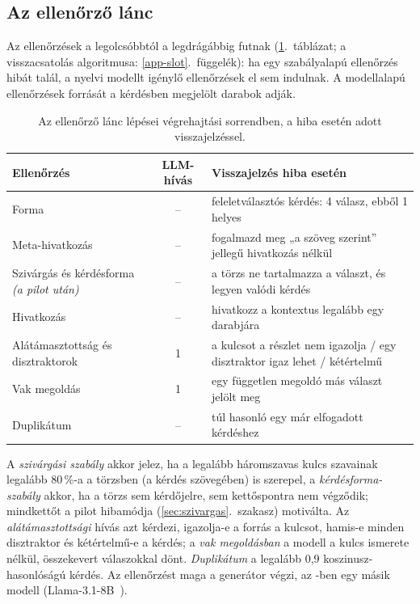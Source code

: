 \subsection{Az ellenőrző lánc}
\label{sec:verifier}

Az ellenőrzések a legolcsóbbtól a legdrágábbig futnak (\ref{tab:checks}.~táblázat; a visszacsatolás
algoritmusa: \ref{app-slot}.~függelék): ha egy szabályalapú ellenőrzés
hibát talál, a nyelvi modellt igénylő ellenőrzések el sem indulnak. A modellalapú ellenőrzések forrását a
kérdésben megjelölt darabok adják.

\begin{table}[htbp]
\centering
\caption{Az ellenőrző lánc lépései végrehajtási sorrendben, a hiba esetén adott visszajelzéssel.}
\label{tab:checks}
\small
\begin{tabularx}{\textwidth}{@{}>{\raggedright\arraybackslash}p{3.8cm}c>{\raggedright\arraybackslash}X@{}}
\toprule
Ellenőrzés & LLM-hívás & Visszajelzés hiba esetén \\
\midrule
Forma & -- & feleletválasztós kérdés: 4 válasz, ebből 1 helyes \\
Meta-hivatkozás & -- & fogalmazd meg „a szöveg szerint” jellegű hivatkozás nélkül \\
Szivárgás és kérdésforma \emph{(a pilot után)} & -- & a törzs ne tartalmazza a választ, és legyen valódi kérdés \\
Hivatkozás & -- & hivatkozz a kontextus legalább egy darabjára \\
Alátámasztottság és disztraktorok & 1 & a kulcsot a részlet nem igazolja / egy disztraktor igaz lehet / kétértelmű \\
Vak megoldás & 1 & egy független megoldó más választ jelölt meg \\
Duplikátum & -- & túl hasonló egy már elfogadott kérdéshez \\
\bottomrule
\end{tabularx}
\end{table}

A \emph{szivárgási szabály} akkor jelez, ha a legalább háromszavas kulcs szavainak legalább 80\,\%-a a
törzsben (a kérdés szövegében) is szerepel, a \emph{kérdésforma-szabály} akkor, ha a törzs sem kérdőjelre,
sem kettőspontra nem végződik; mindkettőt a pilot hibamódja (\ref{sec:szivargas}.~szakasz) motiválta.
Az \emph{alátámasztottsági} hívás azt kérdezi, igazolja-e a forrás a kulcsot, hamis-e minden disztraktor
és kétértelmű-e a kérdés; a \emph{vak megoldásban} a modell a kulcs ismerete nélkül, összekevert
válaszokkal dönt. \emph{Duplikátum} a legalább 0,9 koszinusz-hasonlóságú kérdés. Az ellenőrzést maga a
generátor végzi, az -ben egy másik modell (Llama-3.1-8B~\cite{grattafiori2024llama3}).


